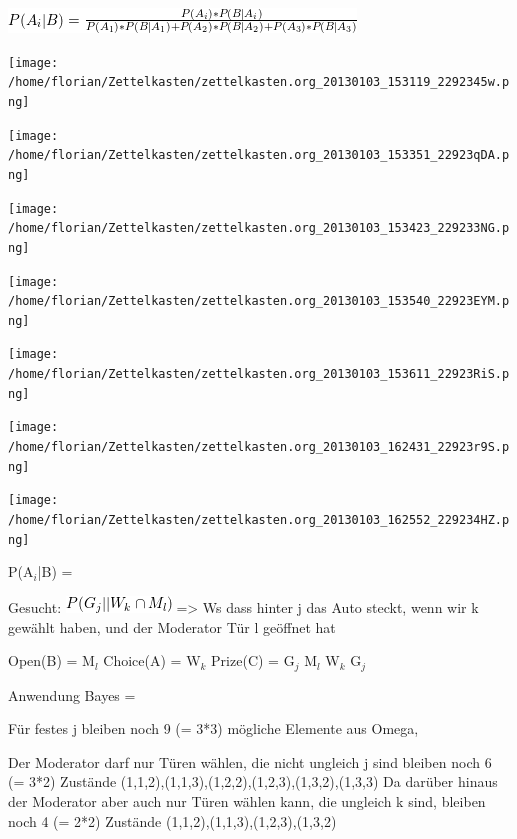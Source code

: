 \documentclass[11pt]{article}
\begin{document}
\begin{itemize}
\includegraphics[width=.9\linewidth]{201301ad-19123649498Bz.png}


\texttt{[image: /home/florian/Zettelkasten/zettelkasten.org\_20130103\_153119\_2292345w.png]}

\texttt{[image: /home/florian/Zettelkasten/zettelkasten.org\_20130103\_153351\_22923qDA.png]}

\texttt{[image: /home/florian/Zettelkasten/zettelkasten.org\_20130103\_153423\_229233NG.png]}

\texttt{[image: /home/florian/Zettelkasten/zettelkasten.org\_20130103\_153540\_22923EYM.png]}

\texttt{[image: /home/florian/Zettelkasten/zettelkasten.org\_20130103\_153611\_22923RiS.png]}

\texttt{[image: /home/florian/Zettelkasten/zettelkasten.org\_20130103\_162431\_22923r9S.png]}

\texttt{[image: /home/florian/Zettelkasten/zettelkasten.org\_20130103\_162552\_229234HZ.png]}

P(A$_i$|B) = 


Gesucht: \includegraphics[width=.9\linewidth]{201301ad-1914034949uLC.png}  => Ws dass hinter j das Auto steckt, wenn wir k gewählt haben, und der Moderator Tür l geöffnet hat





Open(B) = M$_l$
Choice(A) = W$_k$
Prize(C) = G$_j$
M$_l$
W$_k$
G$_j$

Anwendung Bayes
= 

Für festes j bleiben noch 9 (= 3*3) mögliche Elemente aus Omega,

Der Moderator darf nur Türen wählen, die nicht ungleich j sind bleiben noch 6 (= 3*2) Zustände
(1,1,2),(1,1,3),(1,2,2),(1,2,3),(1,3,2),(1,3,3)
Da darüber hinaus der Moderator aber auch nur Türen wählen kann, die ungleich k sind, bleiben noch 4 (= 2*2) Zustände
(1,1,2),(1,1,3),(1,2,3),(1,3,2)



\end{itemize}
\end{document}
